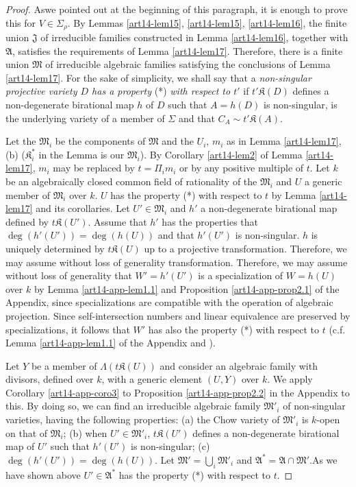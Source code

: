 \begin{proof}
As\pageoriginale we pointed out at the beginning of this paragraph, it is enough to prove this for $V\in \Sigma_{\rho}$. By Lemmas \ref{art14-lem15}, \ref{art14-lem15}, \ref{art14-lem16}, the finite union $\mathfrak{J}$ of irreducible families constructed in Lemma \ref{art14-lem16}, together with $\mathfrak{A}$, satisfies the requirements of Lemma \ref{art14-lem17}. Therefore, there is a finite union $\mathfrak{M}$ of irreducible algebraic families satisfying the conclusions of Lemma \ref{art14-lem17}. For the sake of simplicity, we shall say that a {\em non-singular projective variety $D$ has a property} (*) {\em with respect to $t'$} if $t'\mathfrak{K}(D)$ defines a non-degenerate birational map $h$ of $D$ such that $A=h(D)$ is non-singular, is the underlying variety of a member of $\Sigma$ and that $C_{A}\sim t'\mathfrak{K}(A)$.

Let the $\mathfrak{M}_{i}$ be the components of $\mathfrak{M}$ and the $U_{i}$, $m_{i}$ as in Lemma \ref{art14-lem17}, (b) ($\mathfrak{K}^{*}_{i}$ in the Lemma is our $\mathfrak{M}_{i}$). By Corollary \ref{art14-lem2} of Lemma \ref{art14-lem17}, $m_{i}$ may be replaced by $t=\Pi_{i}m_{i}$ or by any positive multiple of $t$. Let $k$ be an algebraically closed common field of rationality of the $\mathfrak{M}_{i}$ and $U$ a generic member of $\mathfrak{M}_{i}$ over $k$. $U$ has the property (*) with respect to $t$ by Lemma \ref{art14-lem17} and its corollaries. Let $U'\in \mathfrak{M}_{i}$ and $h'$ a non-degenerate birational map defined by $t\mathfrak{K}(U')$. Assume that $h'$ has the properties that $\deg(h'(U'))=\deg (h(U))$ and that $h'(U')$ is non-singular. $h$ is uniquely determined by $t\mathfrak{K}(U)$ up to a projective transformation. Therefore, we may assume without loss of generality transformation. Therefore, we may assume without loss of generality that $W'=h'(U')$ is a specialization of $W=h(U)$ over $k$ by Lemma \ref{art14-app-lem1.1} and Proposition \ref{art14-app-prop2.1} of the Appendix, since specializations are compatible with the operation of algebraic projection. Since self-intersection numbers and linear equivalence are preserved by specializations, it follows that $W'$ has also the property (*) with respect to $t$ (c.f. Lemma \ref{art14-app-lem1.1} of the Appendix and \cite{art14-key2}).

Let $Y$ be a member of $\Lambda(t\mathfrak{K}(U))$ and consider an algebraic family with divisors, defined over $k$, with a generic element $(U,Y)$ over $k$. We apply Corollary \ref{art14-app-coro3} to Proposition \ref{art14-app-prop2.2} in the Appendix to this. By doing so, we can find an irreducible algebraic family $\mathfrak{M}'_{i}$ of non-singular varieties, having the following properties: (a) the Chow variety of $\mathfrak{M}'_{i}$ is $k$-open on that of $\mathfrak{M}_{i}$; (b) when $U'\in \mathfrak{M}'_{i}$, $t\mathfrak{K}(U')$ defines a non-degenerate birational map of $U'$ such that $h'(U')$ is non-singular; (c) $\deg(h'(U'))=\deg (h(U))$. Let $\mathfrak{M}'=\bigcup_{i}\mathfrak{M}'_{i}$ and $\mathfrak{A}^{*}=\mathfrak{A}\cap \mathfrak{M}'$.\pageoriginale As we have shown above $U'\in \mathfrak{A}^{*}$ has the property (*) with respect to $t$.


\end{proof}
